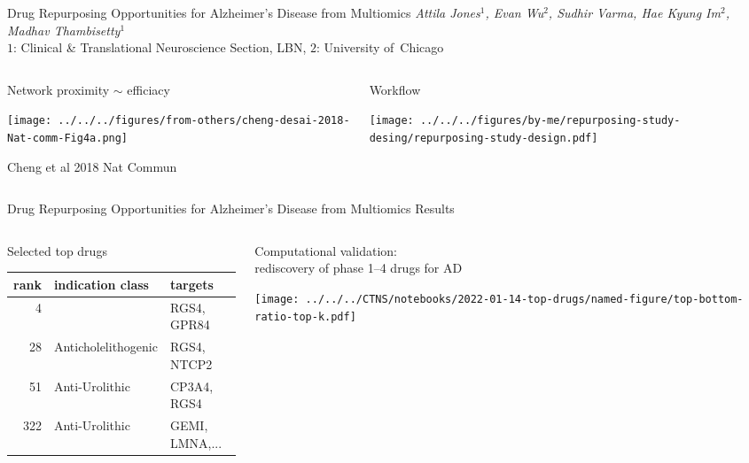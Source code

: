 \documentclass[aspectratio=169]{beamer}
\subtitle{A subtitle may be shorter and more technical}
\author{poster \#1}
\date{Attila Jones}
\begin{document}
\begin{frame}{Drug Repurposing Opportunities for Alzheimer’s Disease from
	Multiomics}
	{\emph{Attila Jones$^1$, Evan Wu$^2$, Sudhir Varma, Hae Kyung Im$^2$, Madhav Thambisetty$^1$}\\
		$1$: Clinical \& Translational Neuroscience Section, LBN, $2$: University
	of~Chicago}

\begin{columns}[t]
\begin{column}{0.35\textwidth}
\begin{center}
	Network proximity $\sim$
	efficiacy
\end{center}

\texttt{[image: ../../../figures/from-others/cheng-desai-2018-Nat-comm-Fig4a.png]}

\tiny
Cheng et al 2018 Nat Commun
\end{column}

\begin{column}{0.7\textwidth}
\begin{center}
	Workflow
\end{center}

\texttt{[image: ../../../figures/by-me/repurposing-study-desing/repurposing-study-design.pdf]}
\end{column}
\end{columns}
\end{frame}

\begin{frame}{Drug Repurposing Opportunities for Alzheimer’s Disease from
	Multiomics}
	{Results}

\begin{columns}[t]
\begin{column}{0.5\textwidth}
\begin{center}
	Selected top drugs
\end{center}
\footnotesize
\begin{tabular}{rll}
	rank & indication class    & targets \\
	\hline
	4    &                     & RGS4, GPR84 \\
	28   & Anticholelithogenic & RGS4, NTCP2 \\
	51   & Anti-Urolithic      & CP3A4, RGS4 \\
	322  & Anti-Urolithic      & GEMI, LMNA,... \\
\end{tabular}
\end{column}

\begin{column}{0.5\textwidth}
\begin{center}
	Computational validation:\\
	rediscovery of phase 1--4 drugs for AD
\end{center}

\texttt{[image: ../../../CTNS/notebooks/2022-01-14-top-drugs/named-figure/top-bottom-ratio-top-k.pdf]}
\end{column}
\end{columns}
\end{frame}
\end{document}
